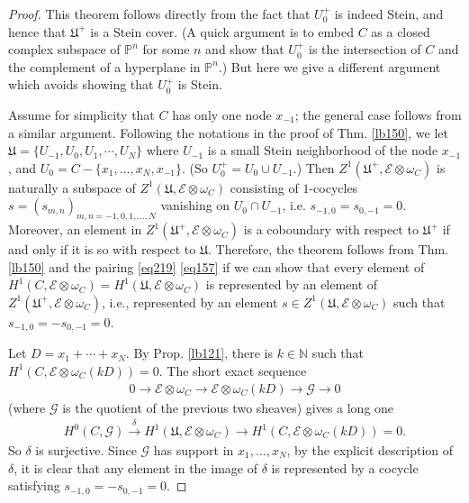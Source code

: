 \documentclass[12pt,b5paper,notitlepage]{report}
\theoremstyle{definition}
\theoremstyle{plain}
\newcommand{\fk}{\mathfrak}
\newcommand{\scr}{\mathscr}
\newcommand{\Nbb}{\mathbb N}
\newcommand{\Pbb}{\mathbb P}
\numberwithin{equation}{section}
\begin{document}
\begin{proof}
This theorem follows directly from the fact that $U_0^+$ is indeed Stein, and hence that $\fk U^+$ is a Stein cover. (A quick argument is to embed $C$ as a closed complex subspace of $\Pbb^n$ for some $n$ and show that $U_0^+$ is the intersection of $C$ and the complement of a hyperplane in $\Pbb^n$.) But here we give a different argument which avoids showing that $U_0^+$ is Stein.

Assume for simplicity that $C$ has only one node $x_{-1}$; the general case follows from a similar argument. Following the notations in the proof of Thm. \ref{lb150}, we let $\fk U=\{U_{-1},U_0,U_1,\cdots,U_N\}$ where $U_{-1}$ is a small Stein neighborhood of the node $x_{-1}$, and $U_0=C-\{x_1,\dots,x_N, x_{-1}\}$. (So $U_0^+=U_0\cup U_{-1}$.) Then  $Z^1(\fk U^+,\scr E\otimes\omega_C)$ is naturally a subspace of $Z^1(\fk U,\scr E\otimes\omega_C)$ consisting of $1$-cocycles $s=(s_{m,n})_{m,n=-1,0,1,\dots,N}$ vanishing on $U_0\cap U_{-1}$, i.e. $s_{-1,0}=s_{0,-1}=0$. Moreover, an element in $Z^1(\fk U^+,\scr E\otimes\omega_C)$ is a coboundary with respect to $\fk U^+$ if and only if it is so with respect to $\fk U$. Therefore, the theorem follows from Thm. \ref{lb150}  and the pairing \eqref{eq219} \eqref{eq157} if we can show that every element of $H^1(C,\scr E\otimes\omega_C)=H^1(\fk U,\scr E\otimes\omega_C)$ is represented by an element of $Z^1(\fk U^+,\scr E\otimes\omega_C)$, i.e., represented by an element  $s\in Z^1(\fk U,\scr E\otimes\omega_C)$ such that $s_{-1,0}=-s_{0,-1}=0$.

Let $D=x_1+\cdots+x_N$. By Prop. \ref{lb121}, there is $k\in\Nbb$ such that $H^1(C,\scr E\otimes\omega_C(kD))=0$. The short exact sequence
\begin{align*}
0\rightarrow\scr E\otimes\omega_C\rightarrow\scr E\otimes\omega_C(kD)\rightarrow\scr G\rightarrow 0
\end{align*} 
(where $\scr G$ is the quotient of the previous two sheaves) gives a long one
\begin{align*}
H^0(C,\scr G)\xrightarrow{\delta} H^1(\fk U,\scr E\otimes\omega_C)\rightarrow H^1(C,\scr E\otimes\omega_C(kD))=0.
\end{align*}
So $\delta$ is surjective. Since $\scr G$ has support in $x_1,\dots,x_N$, by the explicit description of $\delta$, it is clear that any element in the image of $\delta$ is represented by a cocycle satisfying  $s_{-1,0}=-s_{0,-1}=0$.
\end{proof}
\end{document}
